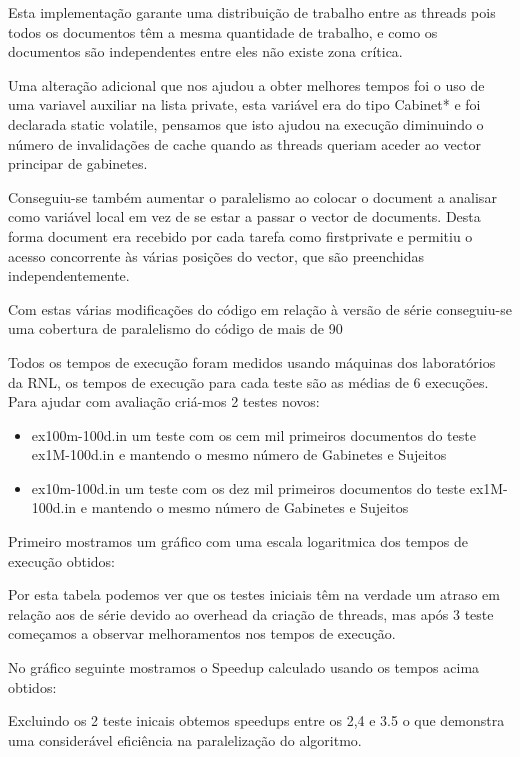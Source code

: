 \documentclass[times, 10pt,twocolumn]{article}
\begin{document}
Esta implementação garante uma distribuição de trabalho entre as threads pois todos os documentos têm a mesma quantidade de trabalho, e como os documentos são independentes entre eles não existe zona crítica.

Uma alteração adicional que nos ajudou a obter melhores tempos foi o uso de uma variavel auxiliar na lista private, esta variável era do tipo Cabinet* e foi declarada static volatile, pensamos que isto ajudou na execução diminuindo o número de invalidações de cache quando as threads queriam aceder ao vector principar de gabinetes.

Conseguiu-se também aumentar o paralelismo ao colocar o document a analisar como variável local em vez de se estar a passar o vector de documents. Desta forma document era recebido por cada tarefa como firstprivate e permitiu o acesso concorrente às várias posições do vector, que são preenchidas independentemente.

Com estas várias modificações do código em relação à versão de série conseguiu-se uma cobertura de paralelismo do código de mais de 90%



Todos os tempos de execução foram medidos usando máquinas dos laboratórios da RNL, os tempos de execução para cada teste são as médias de 6 execuções.
Para ajudar com avaliação criá-mos 2 testes novos:
\begin{itemize}
\item ex100m-100d.in um teste com os cem mil primeiros documentos do teste ex1M-100d.in e mantendo o mesmo número de Gabinetes e Sujeitos
\item ex10m-100d.in um teste com os dez mil primeiros documentos do teste ex1M-100d.in e mantendo o mesmo número de Gabinetes e Sujeitos
\end{itemize}

Primeiro mostramos um gráfico com uma escala logaritmica dos tempos de execução obtidos:


Por esta tabela podemos ver que os testes iniciais têm na verdade um atraso em relação aos de série devido ao overhead da criação de threads, mas após 3 teste começamos a observar melhoramentos nos tempos de execução.

No gráfico seguinte mostramos o Speedup calculado usando os tempos acima obtidos:


Excluindo os 2 teste inicais obtemos speedups entre os 2,4 e 3.5 o que demonstra uma considerável eficiência na paralelização do algoritmo.



\end{document}
